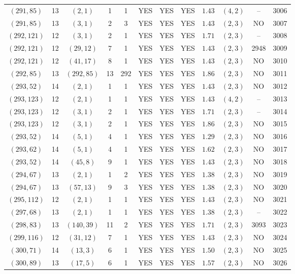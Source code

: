 \begin{longtable}{|c|c|c|c|c|c|c|c|c|c|c|c|}
$(291,85)$ & 13 & $(2,1)$ & 1 & 1 & YES & YES & YES & $1.43$ & $(4,2)$ & -- & 3006\\
$(291,85)$ & 13 & $(3,1)$ & 2 & 3 & YES & YES & YES & $1.43$ & $(2,3)$ & NO & 3007\\
$(292,121)$ & 12 & $(3,1)$ & 2 & 1 & YES & YES & YES & $1.71$ & $(2,3)$ & -- & 3008\\
$(292,121)$ & 12 & $(29,12)$ & 7 & 1 & YES & YES & YES & $1.43$ & $(2,3)$ & 2948 & 3009\\
$(292,121)$ & 12 & $(41,17)$ & 8 & 1 & YES & YES & YES & $1.43$ & $(2,3)$ & NO & 3010\\
$(292,85)$ & 13 & $(292,85)$ & 13 & 292 & YES & YES & YES & $1.86$ & $(2,3)$ & NO & 3011\\
$(293,52)$ & 14 & $(2,1)$ & 1 & 1 & YES & YES & YES & $1.43$ & $(2,3)$ & NO & 3012\\
$(293,123)$ & 12 & $(2,1)$ & 1 & 1 & YES & YES & YES & $1.43$ & $(4,2)$ & -- & 3013\\
$(293,123)$ & 12 & $(3,1)$ & 2 & 1 & YES & YES & YES & $1.71$ & $(2,3)$ & -- & 3014\\
$(293,123)$ & 12 & $(3,1)$ & 2 & 1 & YES & YES & YES & $1.86$ & $(2,3)$ & NO & 3015\\
$(293,52)$ & 14 & $(5,1)$ & 4 & 1 & YES & YES & YES & $1.29$ & $(2,3)$ & NO & 3016\\
$(293,62)$ & 14 & $(5,1)$ & 4 & 1 & YES & YES & YES & $1.62$ & $(2,3)$ & NO & 3017\\
$(293,52)$ & 14 & $(45,8)$ & 9 & 1 & YES & YES & YES & $1.43$ & $(2,3)$ & NO & 3018\\
$(294,67)$ & 13 & $(2,1)$ & 1 & 2 & YES & YES & YES & $1.38$ & $(2,3)$ & NO & 3019\\
$(294,67)$ & 13 & $(57,13)$ & 9 & 3 & YES & YES & YES & $1.38$ & $(2,3)$ & NO & 3020\\
$(295,112)$ & 12 & $(2,1)$ & 1 & 1 & YES & YES & YES & $1.43$ & $(2,3)$ & NO & 3021\\
$(297,68)$ & 13 & $(2,1)$ & 1 & 1 & YES & YES & YES & $1.38$ & $(2,3)$ & -- & 3022\\
$(298,83)$ & 13 & $(140,39)$ & 11 & 2 & YES & YES & YES & $1.71$ & $(2,3)$ & 3093 & 3023\\
$(299,116)$ & 12 & $(31,12)$ & 7 & 1 & YES & YES & YES & $1.43$ & $(2,3)$ & NO & 3024\\
$(300,71)$ & 14 & $(13,3)$ & 6 & 1 & YES & YES & YES & $1.50$ & $(2,3)$ & NO & 3025\\
$(300,89)$ & 13 & $(17,5)$ & 6 & 1 & YES & YES & YES & $1.57$ & $(2,3)$ & NO & 3026\\

\end{longtable}
